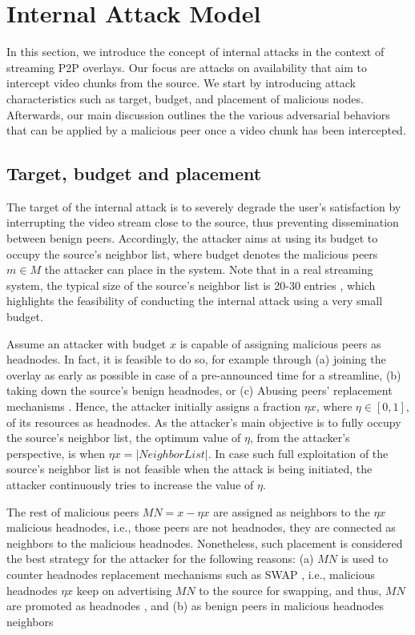 \section{Internal Attack Model}
\label{sec:Attack}

In this section, we introduce the concept of internal attacks in the context of streaming P2P overlays.
Our focus are attacks on availability that aim to intercept video chunks from the source. 
We start by introducing attack characteristics such as target, budget, and placement of malicious nodes. 
Afterwards, our main discussion outlines the the various adversarial behaviors that can be applied by a malicious peer once a video chunk has been intercepted. 

\subsection{Target, budget and placement}


The target of the internal attack is to severely degrade the user's satisfaction by interrupting the video stream close to the source, thus preventing dissemination between benign peers.
Accordingly, the attacker aims at using its budget to occupy the source's neighbor list, where budget denotes the malicious peers $m\in M$ the attacker can place in the system.
Note that in a real streaming system, the typical size of the source's neighbor list is 20-30 entries \cite{neighborlist1,neighborlist2}, which highlights the feasibility of conducting the internal attack using a very small budget.

Assume an attacker with budget $x$ is capable of assigning malicious peers as headnodes.
In fact, it is feasible to do so, for example through (a) joining the overlay as early as possible in case of a pre-announced time for a streamline, (b) taking down the source's benign headnodes, or (c) Abusing peers' replacement mechanisms \cite{nguyen2016swap}.
Hence, the attacker initially assigns a fraction $\eta x$, where $\eta\in [0,1]$, of its resources as headnodes.
As the attacker's main objective is to fully occupy the source's neighbor list, the optimum value of $\eta$, from the attacker's perspective, is when $\eta x = |NeighborList|$.
In case such full exploitation of the source's neighbor list is not feasible when the attack is being initiated, the attacker continuously tries to increase the value of $\eta$.  

The rest of malicious peers $MN=x-\eta x$ are assigned as neighbors to the $\eta x$ malicious headnodes, i.e., those peers are not headnodes, they are connected as neighbors to the malicious headnodes. 
Nonetheless, such placement is considered the best strategy for the attacker for the following reasons: (a) $MN$ is used to counter headnodes replacement mechanisms such as SWAP \cite{nguyen2016swap}, i.e., malicious headnodes $\eta x$ keep on advertising $MN$ to the source for swapping, and thus, $MN$ are promoted as headnodes
, and (b) as benign peers in malicious headnodes neighbors 


